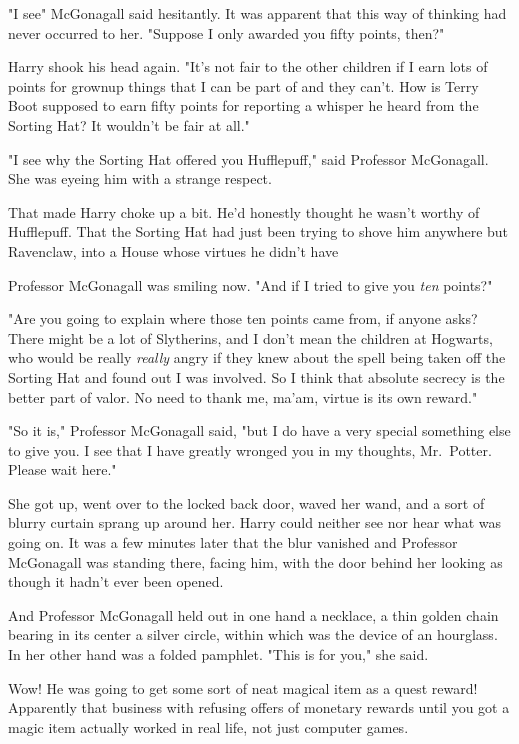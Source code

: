 "I see{\el}" McGonagall said hesitantly. It was apparent that this way of
thinking had never occurred to her. "Suppose I only awarded you fifty points,
then?"

Harry shook his head again. "It's not fair to the other children if I earn lots
of points for grownup things that I can be part of and they can't. How is Terry
Boot supposed to earn fifty points for reporting a whisper he heard from the
Sorting Hat? It wouldn't be fair at all."

"I see why the Sorting Hat offered you Hufflepuff," said Professor McGonagall.
She was eyeing him with a strange respect.

That made Harry choke up a bit. He'd honestly thought he wasn't worthy of
Hufflepuff. That the Sorting Hat had just been trying to shove him anywhere but
Ravenclaw, into a House whose virtues he didn't have{\el}

Professor McGonagall was smiling now. "And if I tried to give you \emph{ten}
points{\el}?"

"Are you going to explain where those ten points came from, if anyone asks?
There might be a lot of Slytherins, and I don't mean the children at Hogwarts,
who would be really \emph{really} angry if they knew about the spell being
taken off the Sorting Hat and found out I was involved. So I think that
absolute secrecy is the better part of valor. No need to thank me, ma'am,
virtue is its own reward."

"So it is," Professor McGonagall said, "but I do have a very special something
else to give you. I see that I have greatly wronged you in my thoughts,
Mr.~Potter. Please wait here."

She got up, went over to the locked back door, waved her wand, and a sort of
blurry curtain sprang up around her. Harry could neither see nor hear what was
going on. It was a few minutes later that the blur vanished and Professor
McGonagall was standing there, facing him, with the door behind her looking as
though it hadn't ever been opened.

And Professor McGonagall held out in one hand a necklace, a thin golden chain
bearing in its center a silver circle, within which was the device of an
hourglass. In her other hand was a folded pamphlet. "This is for you," she said.

Wow! He was going to get some sort of neat magical item as a quest reward!
Apparently that business with refusing offers of monetary rewards until you got
a magic item actually worked in real life, not just computer games.

